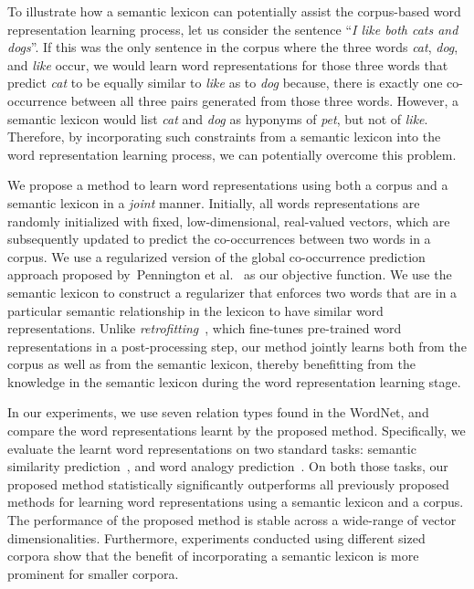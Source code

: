 \documentclass[letterpaper]{article}
\begin{document}
To illustrate how a semantic lexicon can potentially assist the corpus-based word representation learning process,
let us consider the sentence ``\emph{I like both cats and dogs}''.
If this was the only sentence in the corpus where the three words \emph{cat}, \emph{dog}, and \emph{like} occur,
we would learn word representations for those three words
that predict \emph{cat} to be equally similar to \emph{like} as to \emph{dog} because,
there is exactly one co-occurrence between all three pairs generated from those three words.
However, a semantic lexicon would list \emph{cat} and \emph{dog} as hyponyms of \emph{pet}, but not of \emph{like}.
Therefore, by incorporating such constraints from a semantic lexicon
 into the word representation learning process, we can potentially overcome this problem.

We propose a method to learn word representations using both a corpus and a semantic lexicon in a \emph{joint} manner.
Initially, all words representations are randomly initialized with fixed, low-dimensional, real-valued vectors, which are subsequently updated to
predict the co-occurrences between two words in a corpus.
We use a regularized version of the global co-occurrence prediction approach proposed
by~Pennington et al.~ as our objective function.
We use the semantic lexicon to construct a regularizer that enforces two words that are in a particular semantic relationship in the lexicon
to have similar word representations.
Unlike \emph{retrofitting}~\cite{faruqui-EtAl:2015:NAACL-HLT},
which fine-tunes pre-trained word representations in a post-processing step, our method
jointly learns both from the corpus as well as from the semantic lexicon, thereby benefitting from the knowledge in the
semantic lexicon during the word representation learning stage.

In our experiments, we use seven relation types found in the WordNet, and compare the word representations
learnt by the proposed method.
Specifically, we evaluate the learnt word representations on two standard tasks:
semantic similarity prediction~\cite{Bollegala:NAACL:2007}, and word analogy prediction~\cite{Duc:AAAI:2011}.
On both those tasks, our proposed method statistically significantly outperforms all
previously proposed methods for learning word representations using a semantic lexicon and a corpus.
The performance of the proposed method is stable across a wide-range of vector dimensionalities.
Furthermore, experiments conducted using different sized corpora show that the benefit of incorporating a semantic lexicon
is more prominent for smaller corpora.
\end{document}
